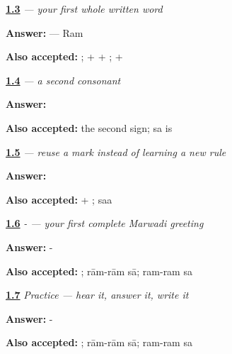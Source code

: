 \noindent\begin{minipage}[t]{\linewidth}
\raggedright
\hyperlink{review-MW-W01-raam-build}{\textbf{1.3}} \emph{ — your first whole written word}\par
\small \textbf{Answer:}  — Ram\par
\footnotesize \textbf{Also accepted:} ;  +  + ;  + 
\end{minipage}\par\medskip

\noindent\begin{minipage}[t]{\linewidth}
\raggedright
\hyperlink{review-MW-W01-sa-choice}{\textbf{1.4}} \emph{ — a second consonant}\par
\small \textbf{Answer:} \par
\footnotesize \textbf{Also accepted:} the second sign; sa is 
\end{minipage}\par\medskip

\noindent\begin{minipage}[t]{\linewidth}
\raggedright
\hyperlink{review-MW-W01-saa-build}{\textbf{1.5}} \emph{ — reuse a mark instead of learning a new rule}\par
\small \textbf{Answer:} \par
\footnotesize \textbf{Also accepted:}  + ; saa
\end{minipage}\par\medskip

\noindent\begin{minipage}[t]{\linewidth}
\raggedright
\hyperlink{review-MW-C01-raam-raam-saa-greeting-cue}{\textbf{1.6}} \emph{-  — your first complete Marwadi greeting}\par
\small \textbf{Answer:} - \par
\footnotesize \textbf{Also accepted:}   ; rām-rām sā; ram-ram sa
\end{minipage}\par\medskip

\noindent\begin{minipage}[t]{\linewidth}
\raggedright
\hyperlink{review-MW-C01-practice-answer}{\textbf{1.7}} \emph{Practice — hear it, answer it, write it}\par
\small \textbf{Answer:} - \par
\footnotesize \textbf{Also accepted:}   ; rām-rām sā; ram-ram sa
\end{minipage}\par\medskip


